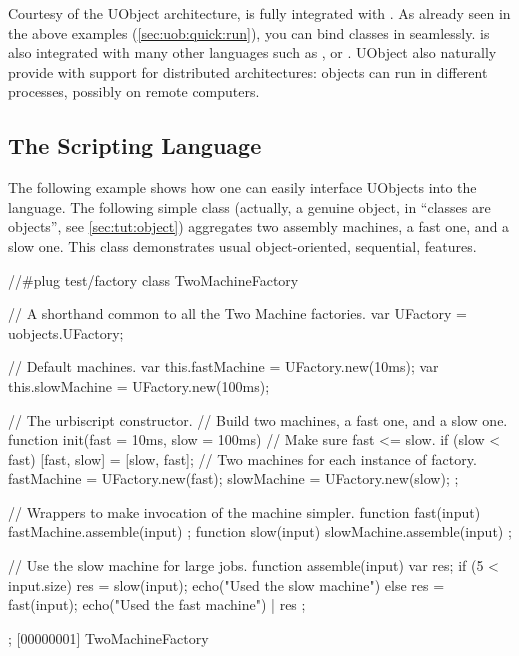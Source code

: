 Courtesy of the UObject architecture, \us is fully integrated with \Cxx. As
already seen in the above examples (\autoref{sec:uob:quick:run}), you can
bind \Cxx classes in \us seamlessly. \us is also integrated with many other
languages such as \Java, \MatLab or \Python.  UObject also naturally provide
\us with support for distributed architectures: objects can run in different
processes, possibly on remote computers.

\subsection{The \us Scripting Language}

The following example shows how one can easily interface UObjects into the
\us language.  The following simple class (actually, a genuine object, in
\us ``classes are objects'', see \autoref{sec:tut:object}) aggregates two
assembly machines, a fast one, and a slow one.  This class demonstrates
usual object-oriented, sequential, features.

\begin{urbiscript}[firstnumber=1]
//#plug test/factory
class TwoMachineFactory
{
  // A shorthand common to all the Two Machine factories.
  var UFactory = uobjects.UFactory;

  // Default machines.
  var this.fastMachine = UFactory.new(10ms);
  var this.slowMachine = UFactory.new(100ms);

  // The urbiscript constructor.
  // Build two machines, a fast one, and a slow one.
  function init(fast = 10ms, slow = 100ms)
  {
    // Make sure fast <= slow.
    if (slow < fast)
      [fast, slow] = [slow, fast];
    // Two machines for each instance of factory.
    fastMachine = UFactory.new(fast);
    slowMachine = UFactory.new(slow);
  };

  // Wrappers to make invocation of the machine simpler.
  function fast(input) { fastMachine.assemble(input) };
  function slow(input) { slowMachine.assemble(input) };

  // Use the slow machine for large jobs.
  function assemble(input)
  {
    var res;
    if (5 < input.size)
      { res = slow(input); echo("Used the slow machine") }
    else
      { res = fast(input); echo("Used the fast machine") } |
    res
  };
};
[00000001] TwoMachineFactory
\end{urbiscript}

